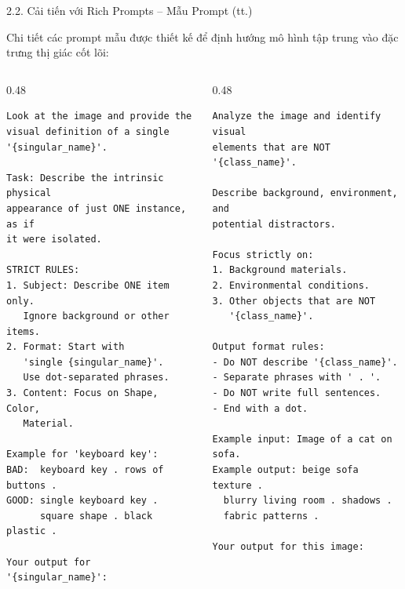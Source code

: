 \documentclass[11pt]{beamer}
\begin{document}
\begin{frame}[fragile, shrink=5]{2.2. Cải tiến với Rich Prompts -- Mẫu Prompt (tt.)}
\scriptsize

Chi tiết các prompt mẫu được thiết kế để định hướng mô hình tập trung vào
đặc trưng thị giác cốt lõi:

\begin{columns}[T,onlytextwidth]
\begin{column}{0.48\textwidth}
\begin{lstlisting}[style=bashstyle,caption={Positive Prompt},label=lst:pos_prompt]
Look at the image and provide the
visual definition of a single
'{singular_name}'.

Task: Describe the intrinsic physical
appearance of just ONE instance, as if
it were isolated.

STRICT RULES:
1. Subject: Describe ONE item only.
   Ignore background or other items.
2. Format: Start with
   'single {singular_name}'.
   Use dot-separated phrases.
3. Content: Focus on Shape, Color,
   Material.

Example for 'keyboard key':
BAD:  keyboard key . rows of buttons .
GOOD: single keyboard key .
      square shape . black plastic .

Your output for '{singular_name}':
\end{lstlisting}
\end{column}

\begin{column}{0.48\textwidth}
\begin{lstlisting}[style=bashstyle,caption={Negative Prompt},label=lst:neg_prompt]
Analyze the image and identify visual
elements that are NOT '{class_name}'.

Describe background, environment, and
potential distractors.

Focus strictly on:
1. Background materials.
2. Environmental conditions.
3. Other objects that are NOT
   '{class_name}'.

Output format rules:
- Do NOT describe '{class_name}'.
- Separate phrases with ' . '.
- Do NOT write full sentences.
- End with a dot.

Example input: Image of a cat on sofa.
Example output: beige sofa texture .
  blurry living room . shadows .
  fabric patterns .

Your output for this image:
\end{lstlisting}
\end{column}
\end{columns}

\end{frame}
\end{document}
